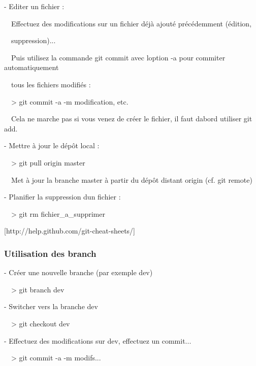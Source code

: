 \documentclass{mise_en_page}
\begin{document}
{}- Editer un fichier :

\ \ Effectuez des modifications sur un fichier déjà ajouté précédemment
(édition,

\ \ suppression)...

\ \ Puis utilisez la commande git commit avec l{\textquotesingle}option
-a pour commiter automatiquement

\ \ tous les fichiers modifiés :

\ \ {\textgreater} git commit -a -m {\textquotedbl}modification,
etc.{\textquotedbl}




\ \ Cela ne marche pas si vous venez de créer le fichier, il faut
d{\textquotesingle}abord utiliser git add.







{}- Mettre à jour le dépôt local :

\ \ {\textgreater} git pull origin master

\ \ Met à jour la branche master à partir du dépôt distant origin (cf.
git remote)







{}- Planifier la suppression d{\textquotesingle}un fichier :

\ \ {\textgreater} git rm fichier\_a\_supprimer




[http://help.github.com/git-cheat-sheets/]

\subsubsection{Utilisation des branch}



 {}- Créer une nouvelle branche (par exemple
{\textquotedbl}dev{\textquotedbl})

\ \ {\textgreater} git branch dev




 {}- Switcher vers la branche {\textquotedbl}dev{\textquotedbl}

\ \ {\textgreater} git checkout dev




 {}- Effectuez des modifications sur {\textquotedbl}dev{\textquotedbl},
effectuez un commit...

\ \ {\textgreater} git commit -a -m
{\textquotedbl}modifs...{\textquotedbl}
\end{document}

